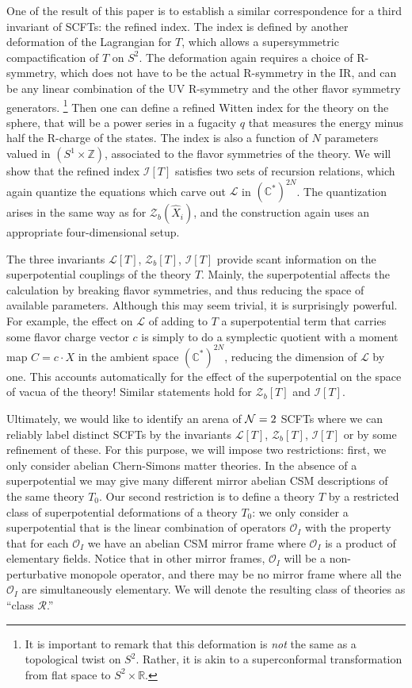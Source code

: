 \documentclass[11pt,letterpaper]{article}
\numberwithin{equation}{section}
\newcommand{\Z}{{\mathbb Z}}
\newcommand{\R}{{\mathbb R}}
\newcommand{\C}{{\mathbb C}}
\newcommand{\CI}{\mathcal{I}}
\newcommand{\CL}{\mathcal{L}}
\newcommand{\CO}{\mathcal{O}}
\newcommand{\CR}{\mathcal{R}}
\newcommand{\CZ}{\mathcal{Z}}
\begin{document}
One of the result of this paper is to establish a similar correspondence for a third invariant of SCFTs: the refined index. The index is defined by another deformation of the Lagrangian for $T$,
which allows a supersymmetric compactification of $T$ on $S^2$. The deformation again requires a choice of R-symmetry,
which does not have to be the actual R-symmetry in the IR, and can be any linear combination of the UV R-symmetry and the other flavor symmetry generators.%
%
\footnote{It is important to remark that this deformation is {\it not} the same as a topological twist on $S^2$. Rather, it is akin to a superconformal transformation
from flat space to $S^2 \times \R$.} %
%
Then one can define a refined Witten index for the theory on the sphere, that will be a power series in a fugacity $q$ that measures the energy minus half the R-charge of the states.
The index is also a function of $N$ parameters valued in  $(S^1 \times \Z)$, associated to the flavor symmetries of the theory.
We will show that the refined index $\CI[T]$ satisfies two sets of recursion relations, which again quantize the equations which carve out $\CL$ in $(\C^*)^{2N}$.
The quantization arises in the same way as for $\CZ_b(\hat X_i)$, and the construction again uses an appropriate four-dimensional setup.

The three invariants $\CL[T]$, $\CZ_b[T]$, $\CI[T]$ provide scant information on the superpotential couplings of the theory $T$.
Mainly, the superpotential affects the calculation by breaking flavor symmetries, and thus reducing the space of available parameters.
Although this may seem trivial, it is surprisingly powerful. For example, the effect on $\CL$ of adding to $T$ a superpotential term that carries some flavor charge vector $c$
is simply to do a symplectic quotient with a moment map $C=c \cdot X$ in the ambient space $(\C^*)^{2N}$, reducing the dimension of $\CL$ by one. This accounts automatically for the effect of the superpotential on the space of vacua of the theory!
 Similar statements hold for $\CZ_b[T]$ and $\CI[T]$.

 Ultimately, we would like to identify an arena of ${\cal N}=2$ SCFTs where we can reliably label distinct SCFTs by the invariants
 $\CL[T]$, $\CZ_b[T]$, $\CI[T]$ or by some refinement of these.
For this purpose, we will impose two restrictions: first, we only consider abelian Chern-Simons matter theories.
In the absence of a superpotential we may give many different mirror abelian CSM descriptions of the same theory $T_0$.
Our second restriction is to define a theory $T$ by a restricted class of superpotential deformations of a theory $T_0$:
we  only consider a superpotential that is the linear combination of operators $\CO_I$
with the property that for each $\CO_I$ we have an abelian CSM mirror frame where $\CO_I$
is a product of elementary fields. Notice that in other mirror frames, $\CO_I$ will be a non-perturbative  monopole operator,
and there may be no mirror frame where all the $\CO_I$ are simultaneously elementary.
We will denote the resulting class of theories as ``class $\CR$.''
\end{document}
